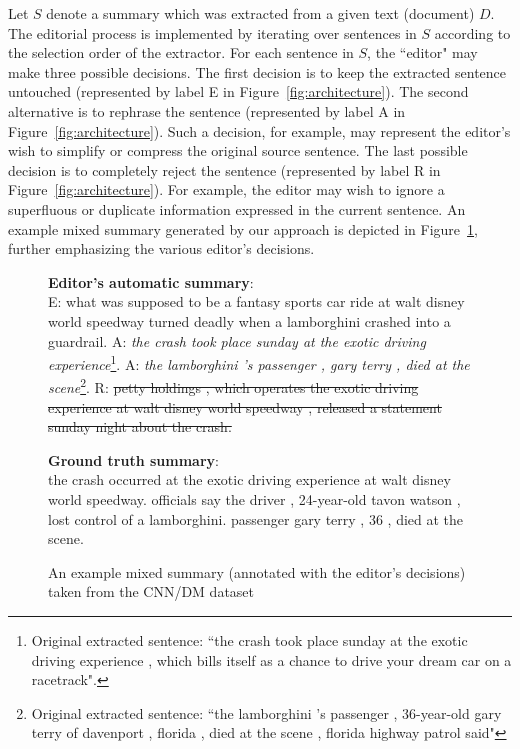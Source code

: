 \documentclass{article}
\begin{document}
Let $S$ denote a summary which was extracted from a given text (document) $D$.
The editorial process is implemented by iterating over sentences in $S$ according to the selection order of the extractor.
For each sentence in $S$, the ``editor" may make three possible decisions. The first decision is to keep the extracted sentence untouched (represented by label \textsf{E} in Figure~\ref{fig:architecture}). 
The second alternative is to rephrase the sentence (represented by label \textsf{A} in Figure~\ref{fig:architecture}). Such a decision, for example, may represent the editor's wish to simplify or compress the original source sentence. The last possible decision is to completely reject the sentence (represented by label \textsf{R} in Figure~\ref{fig:architecture}). For example, the editor may wish to ignore a superfluous or duplicate information expressed in the current sentence.
An example mixed summary generated by our approach is depicted in Figure~\ref{example summary}, further emphasizing the various editor's decisions.

\begin{figure}[tbh]
\begin{tcolorbox}[colback = white,boxrule=0.5pt]
  \textbf{Editor's automatic summary}:\\
  \textsf{E}: what was supposed to be a fantasy sports car ride at walt disney world speedway turned deadly when a lamborghini crashed into a guardrail.
  \textsf{A}: \textit{the crash took place sunday at the exotic driving experience}\footnote{Original extracted sentence: ``the crash took place sunday at the exotic driving experience , which bills itself as a chance to drive your dream car on a racetrack".}.
  \textsf{A}: \textit{the lamborghini 's passenger , gary terry , died at the scene}\footnote{Original extracted sentence: ``the lamborghini 's passenger , 36-year-old gary terry of davenport , florida , died at the scene , florida highway patrol said"}.
  \textsf{R}: \st{petty holdings , which operates the exotic driving experience at walt disney world speedway , released a statement sunday night about the crash.}
\end{tcolorbox}
\begin{tcolorbox}[colback = white,boxrule=0.5pt]
  \textbf{Ground truth summary}:\\
  the crash occurred at the exotic driving experience at walt disney world speedway. officials say the driver , 24-year-old tavon watson , lost control of a lamborghini. passenger gary terry , 36 , died at the scene.
\end{tcolorbox}\caption{An example mixed summary (annotated with the editor's decisions) taken from the CNN/DM dataset}\label{example summary}
\end{figure}
\end{document}
